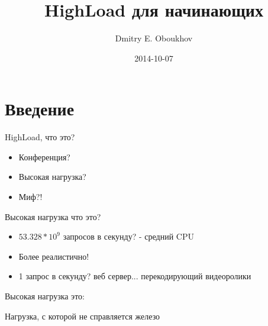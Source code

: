 \documentclass[aspectratio=169]{beamer}
\title{HighLoad для начинающих}
\author{Dmitry E. Oboukhov}
\date{2014-10-07}
\begin{document}
\maketitle

\begin{frame}
    \tableofcontents
\end{frame}

\section{Введение}
\begin{frame}{HighLoad, что это?}
    \begin{itemize}

        \item Конференция?
        
        \pause
        \item Высокая нагрузка?

        \pause
        \item Миф?!
    
    \end{itemize}
\end{frame}

\begin{frame}{Высокая нагрузка что это?}
    \begin{itemize}
        
        \pause
        \item $53.328 * 10^9$  запросов в секунду?
            \pause
            - средний CPU

        \pause
        \item Более реалистично!

        \pause
        \item 1 запрос в секунду?
            \pause
            веб сервер...
            \pause
            перекодирующий видеоролики

    \end{itemize}
\end{frame}

\begin{frame}{Высокая нагрузка это:}
    \pause
    \begin{center}
        {\huge Нагрузка, с которой не справляется железо}
    \end{center}
\end{frame}
\end{document}
